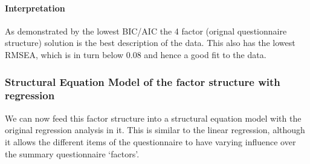\documentclass[]{article}
\let\oldparagraph\paragraph
\renewcommand{\paragraph}[1]{\oldparagraph{#1}\mbox{}}
\begin{document}
\paragraph{Interpretation}\label{interpretation-2}

As demonstrated by the lowest BIC/AIC the 4 factor (orignal
questionnaire structure) solution is the best description of the data.
This also has the lowest RMSEA, which is in turn below 0.08 and hence a
good fit to the data.

\subsubsection{Structural Equation Model of the factor structure with
regression}\label{structural-equation-model-of-the-factor-structure-with-regression}

We can now feed this factor structure into a structural equation model
with the original regression analysis in it. This is similar to the
linear regression, although it allows the different items of the
questionnaire to have varying influence over the summary questionnaire
`factors'.
\end{document}
